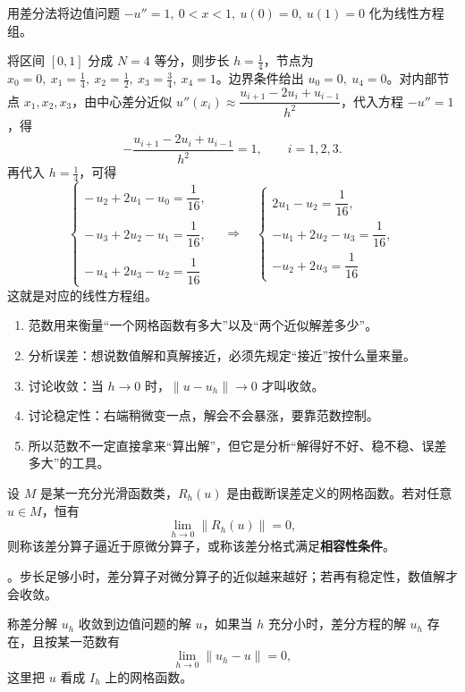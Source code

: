 \begin{example}
用差分法将边值问题 \(-u''=1,\ 0<x<1,\ u(0)=0,\ u(1)=0\) 化为线性方程组。

将区间 \([0,1]\) 分成 \(N=4\) 等分，则步长 \(h=\frac14\)，节点为 \(x_0=0,\ x_1=\frac14,\ x_2=\frac12,\ x_3=\frac34,\ x_4=1\)。边界条件给出 \(u_0=0,\ u_4=0\)。对内部节点 \(x_1,x_2,x_3\)，由中心差分近似 \(u''(x_i)\approx \dfrac{u_{i+1}-2u_i+u_{i-1}}{h^2}\)，代入方程 \(-u''=1\)，得
\[
-\frac{u_{i+1}-2u_i+u_{i-1}}{h^2}=1,\qquad i=1,2,3.
\]
再代入 \(h=\frac14\)，可得
\[
\begin{cases}
-\,u_2+2u_1-u_0=\dfrac{1}{16},\\\\
-\,u_3+2u_2-u_1=\dfrac{1}{16},\\\\
-\,u_4+2u_3-u_2=\dfrac{1}{16}
\end{cases}
\quad \Longrightarrow \quad
\begin{cases}
2u_1-u_2=\dfrac{1}{16},\\
-u_1+2u_2-u_3=\dfrac{1}{16},\\
-u_2+2u_3=\dfrac{1}{16}
\end{cases}
\]
这就是对应的线性方程组。
\end{example}
\begin{enumerate}
    \item 范数用来衡量“一个网格函数有多大”以及“两个近似解差多少”。
    \item 分析误差：想说数值解和真解接近，必须先规定“接近”按什么量来量。
    \item 讨论收敛：当 \(h\to 0\) 时，\(\|u-u_h\|\to 0\) 才叫收敛。
    \item 讨论稳定性：右端稍微变一点，解会不会暴涨，要靠范数控制。
    \item 所以范数不一定直接拿来“算出解”，但它是分析“解得好不好、稳不稳、误差多大”的工具。
\end{enumerate}
\begin{definition}[相容性条件]
设 \(M\) 是某一充分光滑函数类，\(R_h(u)\) 是由截断误差定义的网格函数。若对任意 \(u\in M\)，恒有
\[
\lim_{h\to 0}\|R_h(u)\|=0,
\]
则称该差分算子逼近于原微分算子，或称该差分格式满足\textbf{相容性条件}。
\end{definition}

\begin{note}。步长足够小时，差分算子对微分算子的近似越来越好；若再有稳定性，数值解才会收敛。
\end{note}
\begin{definition}[收敛性]
称差分解 \(u_h\) 收敛到边值问题的解 \(u\)，如果当 \(h\) 充分小时，差分方程的解 \(u_h\) 存在，且按某一范数有
\[
\lim_{h\to 0}\|u_h-u\|=0,
\]
这里把 \(u\) 看成 \(I_h\) 上的网格函数。
\end{definition}

